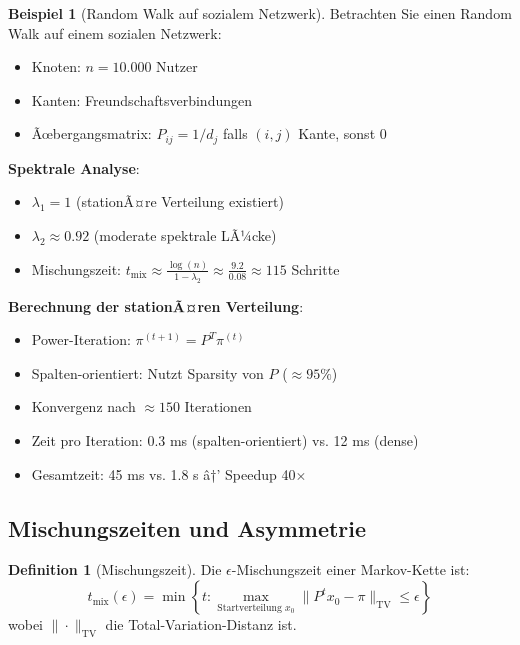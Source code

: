 ﻿\documentclass[a4paper,12pt]{report}
\theoremstyle{definition}
\newtheorem{definition}{Definition}
\newtheorem{beispiel}{Beispiel}
\begin{document}
	\begin{beispiel}[Random Walk auf sozialem Netzwerk]
		Betrachten Sie einen Random Walk auf einem sozialen Netzwerk:
		\begin{itemize}
			\item Knoten: $n = 10.000$ Nutzer
			\item Kanten: Freundschaftsverbindungen
			\item Ãœbergangsmatrix: $P_{ij} = 1/d_j$ falls $(i,j)$ Kante, sonst 0
		\end{itemize}
		
		\textbf{Spektrale Analyse}:
		\begin{itemize}
			\item $\lambda_1 = 1$ (stationÃ¤re Verteilung existiert)
			\item $\lambda_2 \approx 0.92$ (moderate spektrale LÃ¼cke)
			\item Mischungszeit: $t_{\text{mix}} \approx \frac{\log(n)}{1 - \lambda_2} \approx \frac{9.2}{0.08} \approx 115$ Schritte
		\end{itemize}
		
		\textbf{Berechnung der stationÃ¤ren Verteilung}:
		\begin{itemize}
			\item Power-Iteration: $\pi^{(t+1)} = P^T \pi^{(t)}$
			\item Spalten-orientiert: Nutzt Sparsity von $P$ ($\approx 95\%$)
			\item Konvergenz nach $\approx 150$ Iterationen
			\item Zeit pro Iteration: 0.3 ms (spalten-orientiert) vs. 12 ms (dense)
			\item Gesamtzeit: 45 ms vs. 1.8 s â†’ Speedup 40$\times$
		\end{itemize}
	\end{beispiel}
	
	\subsection{Mischungszeiten und Asymmetrie}
	
	\begin{definition}[Mischungszeit]
		Die $\epsilon$-Mischungszeit einer Markov-Kette ist:
		\[
		t_{\text{mix}}(\epsilon) = \min \left\{ t : \max_{\text{Startverteilung } x_0} \|P^t x_0 - \pi\|_{\text{TV}} \leq \epsilon \right\}
		\]
		wobei $\|\cdot\|_{\text{TV}}$ die Total-Variation-Distanz ist.
	\end{definition}
	
\end{document}
